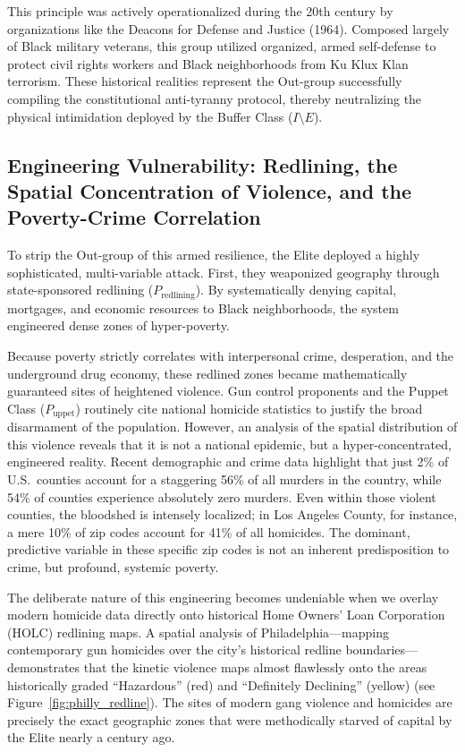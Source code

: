 \documentclass[12pt,openany]{book}
\begin{document}
This principle was actively operationalized during the 20th century by organizations like the Deacons for Defense and Justice (1964). Composed largely of Black military veterans, this group utilized organized, armed self-defense to protect civil rights workers and Black neighborhoods from Ku Klux Klan terrorism. These historical realities represent the Out-group successfully compiling the constitutional anti-tyranny protocol, thereby neutralizing the physical intimidation deployed by the Buffer Class ($I \setminus E$).

\subsection{Engineering Vulnerability: Redlining, the Spatial Concentration of Violence, and the Poverty-Crime Correlation}

To strip the Out-group of this armed resilience, the Elite deployed a highly sophisticated, multi-variable attack. First, they weaponized geography through state-sponsored redlining ($P_{\text{redlining}}$). By systematically denying capital, mortgages, and economic resources to Black neighborhoods, the system engineered dense zones of hyper-poverty.

Because poverty strictly correlates with interpersonal crime, desperation, and the underground drug economy, these redlined zones became mathematically guaranteed sites of heightened violence. Gun control proponents and the Puppet Class ($P_{\text{uppet}}$) routinely cite national homicide statistics to justify the broad disarmament of the population. However, an analysis of the spatial distribution of this violence reveals that it is not a national epidemic, but a hyper-concentrated, engineered reality. Recent demographic and crime data highlight that just 2\% of U.S.\ counties account for a staggering 56\% of all murders in the country, while 54\% of counties experience absolutely zero murders. Even within those violent counties, the bloodshed is intensely localized; in Los Angeles County, for instance, a mere 10\% of zip codes account for 41\% of all homicides. The dominant, predictive variable in these specific zip codes is not an inherent predisposition to crime, but profound, systemic poverty.

The deliberate nature of this engineering becomes undeniable when we overlay modern homicide data directly onto historical Home Owners' Loan Corporation (HOLC) redlining maps. A spatial analysis of Philadelphia---mapping contemporary gun homicides over the city's historical redline boundaries---demonstrates that the kinetic violence maps almost flawlessly onto the areas historically graded ``Hazardous'' (red) and ``Definitely Declining'' (yellow) (see Figure~\ref{fig:philly_redline}). The sites of modern gang violence and homicides are precisely the exact geographic zones that were methodically starved of capital by the Elite nearly a century ago.
\end{document}
